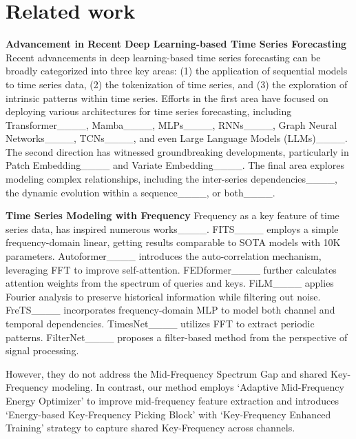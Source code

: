 \section{Related work}
\textbf{Advancement in Recent Deep Learning-based Time Series Forecasting \quad} Recent advancements in deep learning-based time series forecasting can be broadly categorized into three key areas: (1) the application of sequential models to time series data, (2) the tokenization of time series, and (3) the exploration of intrinsic patterns within time series. 
%
Efforts in the first area have focused on deploying various architectures for time series forecasting, including Transformer____, Mamba____, MLPs____, RNNs____, Graph Neural Networks____, TCNs____, and even Large Language Models (LLMs)____.
%
The second direction has witnessed groundbreaking developments, particularly in Patch Embedding____ and Variate Embedding____.
%
The final area explores modeling complex relationships, including the inter-series dependencies____, the dynamic evolution within a sequence____, or both____. 

\textbf{Time Series Modeling with Frequency \quad} Frequency as a key feature of time series data, has inspired numerous works____.
%
FITS____ employs a simple frequency-domain linear, getting results comparable to SOTA models with 10K parameters.
%
Autoformer____ introduces the auto-correlation mechanism, leveraging FFT to improve self-attention. FEDformer____ further calculates attention weights from the spectrum of queries and keys. FiLM____ applies Fourier analysis to preserve historical information while filtering out noise. FreTS____ incorporates frequency-domain MLP to model both channel and temporal dependencies. TimesNet____ utilizes FFT to extract periodic patterns. FilterNet____ proposes a filter-based method from the perspective of signal processing. 

However, they do not address the Mid-Frequency Spectrum Gap and shared Key-Frequency modeling. In contrast, our method employs `Adaptive Mid-Frequency Energy Optimizer' to improve mid-frequency feature extraction and introduces `Energy-based Key-Frequency Picking Block' with `Key-Frequency Enhanced Training' strategy to capture shared Key-Frequency across channels.
